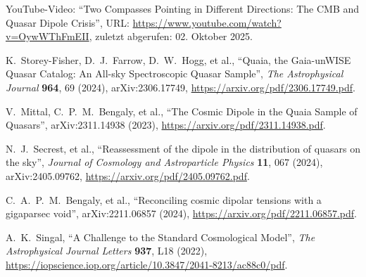 \documentclass{article}
\begin{document}
	\begin{thebibliography}{9}
		
		YouTube-Video: ``Two Compasses Pointing in Different Directions: The CMB and Quasar Dipole Crisis'', 
		URL: \url{https://www.youtube.com/watch?v=OywWThFmEII}, 
		zuletzt abgerufen: 02. Oktober 2025.
		
		K.~Storey-Fisher, D.~J.~Farrow, D.~W.~Hogg, et al.,
		``Quaia, the Gaia-unWISE Quasar Catalog: An All-sky Spectroscopic Quasar Sample'',
		\emph{The Astrophysical Journal} \textbf{964}, 69 (2024),
		arXiv:2306.17749,
		\url{https://arxiv.org/pdf/2306.17749.pdf}.
		
		V.~Mittal, C.~P.~M.~Bengaly, et al.,
		``The Cosmic Dipole in the Quaia Sample of Quasars'',
		arXiv:2311.14938 (2023),
		\url{https://arxiv.org/pdf/2311.14938.pdf}.
		
		N.~J.~Secrest, et al.,
		``Reassessment of the dipole in the distribution of quasars on the sky'',
		\emph{Journal of Cosmology and Astroparticle Physics} \textbf{11}, 067 (2024),
		arXiv:2405.09762,
		\url{https://arxiv.org/pdf/2405.09762.pdf}.
		
		C.~A.~P.~M.~Bengaly, et al.,
		``Reconciling cosmic dipolar tensions with a gigaparsec void'',
		arXiv:2211.06857 (2024),
		\url{https://arxiv.org/pdf/2211.06857.pdf}.
		
		A.~K.~Singal,
		``A Challenge to the Standard Cosmological Model'',
		\emph{The Astrophysical Journal Letters} \textbf{937}, L18 (2022),
		\url{https://iopscience.iop.org/article/10.3847/2041-8213/ac88c0/pdf}.
		
	\end{thebibliography}
	
\end{document}
